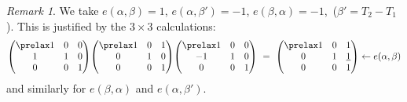 \documentclass{memo-l}
\theoremstyle{definition}
\theoremstyle{remark}
\newtheorem*{remark*}{Remark} %
\numberwithin{section}{chapter}
\numberwithin{equation}{chapter}
\begin{document}
\begin{remark*} We take $e({\alpha},{\beta}) = 1$,
$e({\alpha},{\beta}') = -1$, $e({\beta},{\alpha}) = -1$,\  
(${\beta}'  =  T_{2}-T_{1}$).
This is justified by the $3 \times 3$ calculations:
$$
{\begin{pmatrix} \prelax  1&0&0\\ 1&1&0\\ 0&0&1 \end{pmatrix}} {\begin{pmatrix} \prelax  1&0&1\\ 0&1&0\\ 0&0&1\end{pmatrix}}
{\begin{pmatrix} \prelax  
 1 & 0 & 0 \\ -1 & 1 & 0 \\ 0 & 0 & 1 \end{pmatrix}}\
=\ {\begin{pmatrix} \prelax  1 & 0 & 1 \\ 0 & 1 & {\underline{1}}\\ 0&0&1 \end{pmatrix}} \leftarrow
e(\alpha,\beta)
$$
and similarly for $e({\beta},{\alpha})$ and $e({\alpha},{\beta}')$.
\end{remark*}
\end{document}
